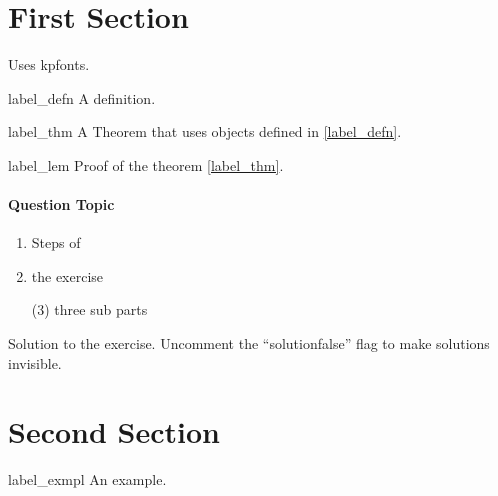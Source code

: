 \documentclass{worksheet}
\begin{document}
	\boldmath
	\maketitle
    \vspace{-1em}
	
 
	\section{First Section}
    
    Uses kpfonts.
	
	\begin{defn}{label_defn}
	A definition.
	\end{defn}


    \begin{theo}{label_thm}
	A Theorem that uses objects defined in  \ref{label_defn}. 
	\end{theo}
    
    \begin{prf}{label_lem}
    Proof of the theorem \ref{label_thm}.
    \end{prf}
    
    
    \paragraph{Question Topic}
    \begin{enumerate}[leftmargin=*, label=(\roman*)]
        \item Steps of
        \item the exercise
        \begin{tasks}(3)
        \task three 
        \task sub 
        \task parts
        \end{tasks}
    \end{enumerate}
    
    \eoq
    
    \begin{solution}
    Solution to the exercise. Uncomment the ``solutionfalse'' flag to make solutions invisible.
    \end{solution}

    
	\section{Second Section}
	
	
	
	\begin{exmpl}[Title]{label_exmpl}
	 An example.
	\end{exmpl}
	
\end{document}
